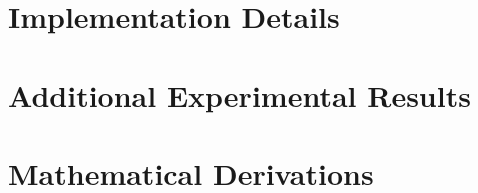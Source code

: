 
\appendix

\chapter{Implementation Details}

\chapter{Additional Experimental Results}

\chapter{Mathematical Derivations}
